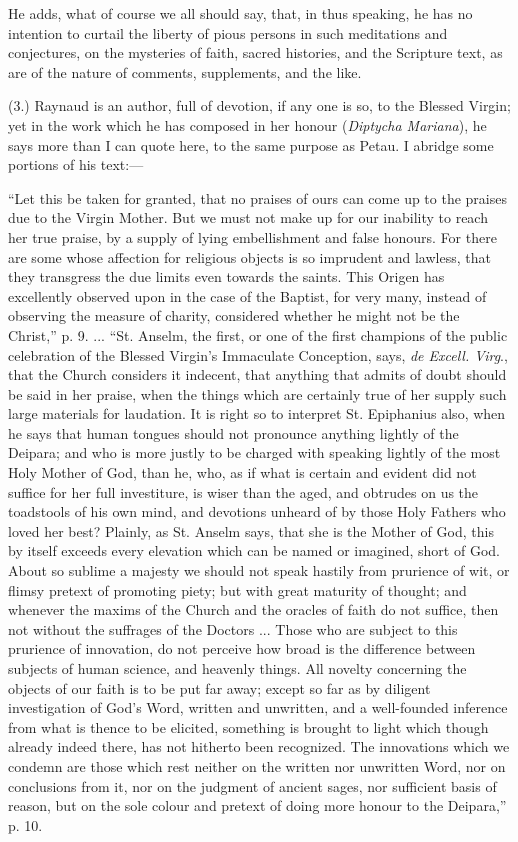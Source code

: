 He adds, what of course we all should say, that, in thus speaking, he
has no intention to curtail the liberty of pious persons in such
meditations and conjectures, on the mysteries of faith, sacred
histories, and the Scripture text, as are of the nature of comments,
supplements, and the like.

(3.) Raynaud is an author, full of devotion, if any one is so, to the
Blessed Virgin; yet in the work which he has composed in her honour (\emph{Diptycha
Mariana}), he says more than I can quote here, to the same purpose as
Petau. I abridge some portions of his text:—

``Let this be taken for granted, that no praises of ours can come up
to the praises due to the Virgin Mother. But we must not make up for our
inability to reach her true praise, by a supply of lying embellishment
and false honours. For there are some whose affection for religious
objects is so imprudent and lawless, that they transgress the due limits
even towards the saints. This Origen has excellently observed upon in
the case of the Baptist, for very many, instead of observing the measure
of charity, considered whether he might not be the Christ,'' p. 9.
... ``St. Anselm, the first, or one of the first champions of the
public celebration of the Blessed Virgin's Immaculate Conception, says, \emph{de
Excell. Virg}., that the Church considers it indecent, that anything
that admits of doubt should be said in her praise, when the things which
are certainly true of her supply such large materials for laudation. It
is right so to interpret St. Epiphanius also, when he says that human
tongues should not pronounce anything lightly of the Deipara; and who is
more justly to be charged with speaking lightly of the most Holy
Mother of God, than he, who, as if what is certain and evident did not
suffice for her full investiture, is wiser than the aged, and obtrudes
on us the toadstools of his own mind, and devotions unheard of by those
Holy Fathers who loved her best? Plainly, as St. Anselm says, that she
is the Mother of God, this by itself exceeds every elevation which can
be named or imagined, short of God. About so sublime a majesty we should
not speak hastily from prurience of wit, or flimsy pretext of promoting
piety; but with great maturity of thought; and whenever the maxims of
the Church and the oracles of faith do not suffice, then not without the
suffrages of the Doctors ... Those who are subject to this prurience of
innovation, do not perceive how broad is the difference between subjects
of human science, and heavenly things. All novelty concerning the
objects of our faith is to be put far away; except so far as by diligent
investigation of God's Word, written and unwritten, and a well-founded
inference from what is thence to be elicited, something is brought to
light which though already indeed there, has not hitherto been
recognized. The innovations which we condemn are those which rest
neither on the written nor unwritten Word, nor on conclusions from it,
nor on the judgment of ancient sages, nor sufficient basis of reason,
but on the sole colour and pretext of doing more honour to the Deipara,''
p. 10.


